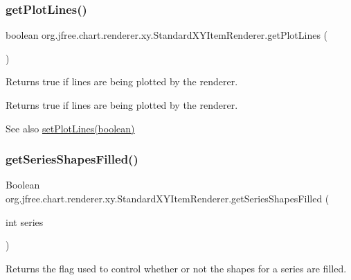 \subsubsection{\texorpdfstring{get\+Plot\+Lines()}{getPlotLines()}}
{\footnotesize\ttfamily boolean org.\+jfree.\+chart.\+renderer.\+xy.\+Standard\+X\+Y\+Item\+Renderer.\+get\+Plot\+Lines (\begin{DoxyParamCaption}{ }\end{DoxyParamCaption})}

Returns true if lines are being plotted by the renderer.

\begin{DoxyReturn}{Returns}
{\ttfamily true} if lines are being plotted by the renderer.
\end{DoxyReturn}
\begin{DoxySeeAlso}{See also}
\mbox{\hyperlink{classorg_1_1jfree_1_1chart_1_1renderer_1_1xy_1_1_standard_x_y_item_renderer_ae909bfacd1b4e2782d23adf501ae54d6}{set\+Plot\+Lines(boolean)}} 
\end{DoxySeeAlso}
\mbox{\label{classorg_1_1jfree_1_1chart_1_1renderer_1_1xy_1_1_standard_x_y_item_renderer_ae5cd12f33b9d935c2536456218d71dcb}} 
\subsubsection{\texorpdfstring{get\+Series\+Shapes\+Filled()}{getSeriesShapesFilled()}}
{\footnotesize\ttfamily Boolean org.\+jfree.\+chart.\+renderer.\+xy.\+Standard\+X\+Y\+Item\+Renderer.\+get\+Series\+Shapes\+Filled (\begin{DoxyParamCaption}\item[{int}]{series }\end{DoxyParamCaption})}

Returns the flag used to control whether or not the shapes for a series are filled.


